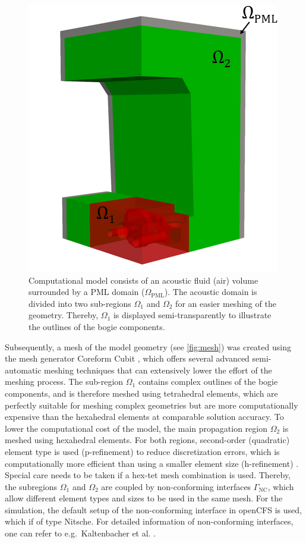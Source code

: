 \begin{figure}
	\centering
	\includegraphics{fig/chap4/mesh/region_small.png}
	\caption{Computational model consists of an acoustic fluid (air) volume surrounded by a PML domain ($\Omega_{\text{PML}}$). The acoustic domain is divided into two sub-regions $\Omega_1$ and $\Omega_2$ for an easier meshing of the geometry. Thereby, $\Omega_1$ is displayed semi-transparently to illustrate the outlines of the bogie components.}
	\label{fig:regions}
\end{figure}
Subsequently, a mesh of the model geometry (see \cref{fig:mesh}) was created using the mesh generator Coreform Cubit \cite{cubit}, which offers several advanced semi-automatic meshing techniques that can extensively lower the effort of the meshing process. The sub-region $\Omega_1$ contains complex outlines of the bogie components, and is therefore meshed using tetrahedral elements, which are perfectly suitable for meshing complex geometries but are more computationally expensive than the hexahedral elements at comparable solution accuracy. To lower the computational cost of the model, the main propagation region $\Omega_2$ is meshed using hexahedral elements. For both regions, second-order (quadratic) element type is used (p-refinement) to reduce discretization errors, which is computationally more efficient than using a smaller element size (h-refinement) \cite{Kuo_2007_prefinement}.
Special care needs to be taken if a hex-tet mesh combination is used. Thereby, the subregions $\Omega_1$ and $\Omega_2$ are coupled by non-conforming interfaces $\Gamma_\text{NC}$, which allow different element types and sizes to be used in the same mesh. For the simulation, the default setup of the non-conforming interface in openCFS is used, which if of type Nitsche. For detailed information of non-conforming interfaces, one can refer to e.g.\ Kaltenbacher et al. \cite{kaltenbacher_nonconforming_2018}.
